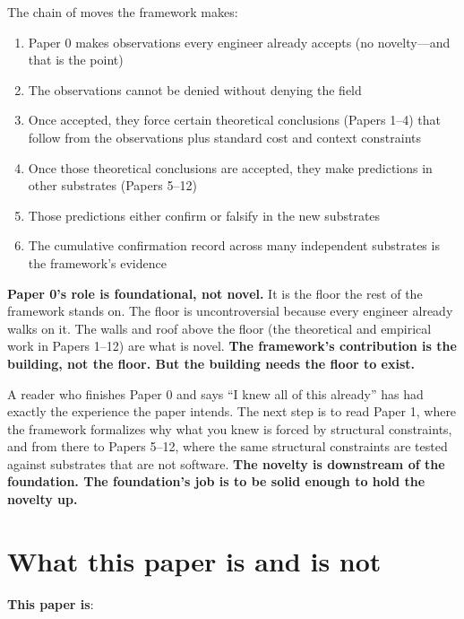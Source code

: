 \documentclass[11pt]{article}
\begin{document}
The chain of moves the framework makes:
\begin{enumerate}
\item Paper 0 makes observations every engineer already accepts (no novelty---and that is the point)
\item The observations cannot be denied without denying the field
\item Once accepted, they force certain theoretical conclusions (Papers 1--4) that follow from the observations plus standard cost and context constraints
\item Once those theoretical conclusions are accepted, they make predictions in other substrates (Papers 5--12)
\item Those predictions either confirm or falsify in the new substrates
\item The cumulative confirmation record across many independent substrates is the framework's evidence
\end{enumerate}

\textbf{Paper 0's role is foundational, not novel.} It is the floor the rest of the framework stands on. The floor is uncontroversial because every engineer already walks on it. The walls and roof above the floor (the theoretical and empirical work in Papers 1--12) are what is novel. \textbf{The framework's contribution is the building, not the floor. But the building needs the floor to exist.}

A reader who finishes Paper 0 and says ``I knew all of this already'' has had exactly the experience the paper intends. The next step is to read Paper 1, where the framework formalizes why what you knew is forced by structural constraints, and from there to Papers 5--12, where the same structural constraints are tested against substrates that are not software. \textbf{The novelty is downstream of the foundation. The foundation's job is to be solid enough to hold the novelty up.}

\section{What this paper is and is not}
\label{sec:scope}

\textbf{This paper is}:
\end{document}
